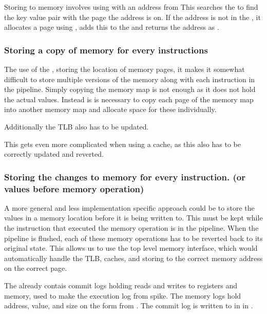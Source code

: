 Storing to memory involves using  with an address from 
This searches the  to find the key value pair with the page the address is on. If the address is not in the , it allocates a page using , adds this to the  and returns the address as .

\subsubsection{Storing a copy of memory for every instructions}

The use of the , storing the location of memory pages, it makes it somewhat difficult to store multiple versions of the memory along with each instruction in the pipeline. Simply copying the memory map is not enough as it does not hold the actual values. Instead is is necessary to copy each page of the memory map into another memory map and allocate space for these individually. 

Additionally the TLB also has to be updated.

This gets even more complicated when using a cache, as this also has to be correctly updated and reverted. 


\subsubsection{Storing the changes to memory for every instruction. (or values before memory operation)}

A more general and less implementation specific approach could be to store the values in a memory location before it is being written to. This must be kept while the instruction that executed the memory operation is in the pipeline. When the pipeline is flushed, each of these memory operations has to be reverted back to its original state. This allows us to use the top level memory interface, which would automatically handle the TLB, caches, and storing to the correct memory address on the correct page.

The  already contais commit logs holding reads and writes to registers and memory, used to make the execution log from spike. The memory logs hold address, value, and size on the form  from . The commit log is written to in  in .

